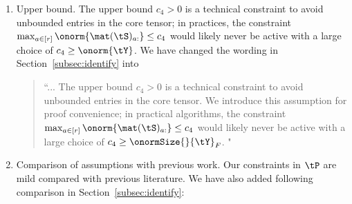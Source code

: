 \documentclass[11pt]{article}
\theoremstyle{definition}
\theoremstyle{definition}
\begin{document}
\begin{enumerate}[wide, labelwidth=!, labelindent=0pt]
\begin{enumerate}
\item Upper bound. The upper bound $c_4>0$ is a technical constraint to avoid unbounded entries in the core tensor; in practices, the constraint $\max_{a\in[r]} \onorm{\mat(\tS)_{a:}} \leq c_4$ would likely never be active with a large choice of $c_4 \geq \onorm{\tY}$. We have changed the wording in Section~\ref{subsec:identify} into

\begin{quote}
    ``... The upper bound $c_4>0$ is a technical constraint to avoid unbounded entries in the core tensor. We introduce this assumption for proof convenience; in practical algorithms, the constraint $\max_{a\in[r]} \onorm{\mat(\tS)_{a:}} \leq c_4$ would likely never be active with a large choice of $c_4 \geq \onormSize{}{\tY}_F$. "
\end{quote}

\item Comparison of assumptions with previous work. Our constraints in $\tP$ are mild compared with previous literature. We have also added following comparison in Section~\ref{subsec:identify}:
\begin{quote}
    \begin{table}[h]
    \centering
    \caption{Parameter space comparison between previous work with our assumption.}
\end{table}
\end{quote}








\end{enumerate}
\end{enumerate}
\end{document}
